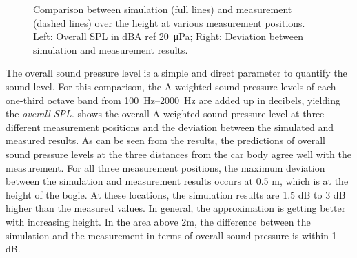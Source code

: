 \begin{figure}
\begin{subfigure}[b]{0.49\textwidth}
	\end{subfigure}
	\caption{Comparison between simulation (full lines) and measurement (dashed lines) over the height at various measurement positions. Left: Overall SPL in dBA ref \SI{20}{\micro\pascal}; Right: Deviation between simulation and measurement results.}
	\label{fig:overall_SPL}
\end{figure}
The overall sound pressure level is a simple and direct parameter to quantify the sound level. 
For this comparison, the A-weighted sound pressure levels of each one-third octave band from \SIrange{100}{2000}{\hertz} are added up in decibels, yielding the \emph{overall SPL}. 
 shows the overall A-weighted sound pressure level at three different measurement positions and the deviation between the simulated and measured results. As can be seen from the results, the predictions of overall sound pressure levels at the three distances from the car body agree well with the measurement. For all three measurement positions, the maximum deviation between the simulation and measurement results occurs at 0.5 m, which is at the height of the bogie. At these locations, the simulation results are 1.5 dB to 3 dB higher than the measured values. In general, the approximation is getting better with increasing height. In the area above 2m, the difference between the simulation and the measurement in terms of overall sound pressure is within 1 dB.

